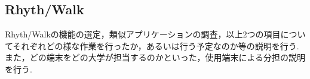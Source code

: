 \subsection{Rhyth/Walk}
\par
Rhyth/Walkの機能の選定，類似アプリケーションの調査，以上2つの項目についてそれぞれどの様な作業を行ったか，あるいは行う予定なのか等の説明を行う.
また，どの端末をどの大学が担当するのかといった，使用端末による分担の説明を行う.
